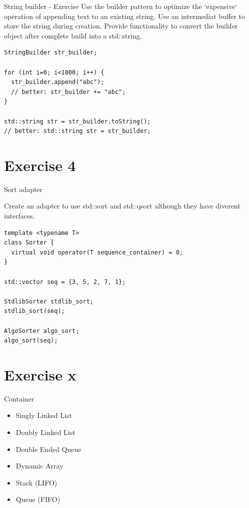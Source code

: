 \documentclass{beamer}
\begin{document}
\begin{frame}[fragile]{String builder - Exercise}
Use the builder pattern to optimize the `expensive` operation of appending text
to an existing string. Use an intermediat buffer to store the string during
creation. Provide functionality to convert the builder object after complete
build into a std::string.

\begin{lstlisting}
StringBuilder str_builder;

for (int i=0; i<1000; i++) {
  str_builder.append("abc");
  // better: str_builder += "abc";
}

std::string str = str_builder.toString();
// better: std::string str = str_builder;
\end{lstlisting}

\end{frame}

\section{Exercise 4}
\begin{frame}[fragile]{Sort adapter}

Create an adapter to use std::sort and std::qsort although they have diverent
interfaces.

\begin{lstlisting}
template <typename T>
class Sorter {
  virtual void operator(T sequence_container) = 0;
}

std::vector seq = {3, 5, 2, 7, 1};

StdlibSorter stdlib_sort;
stdlib_sort(seq);

AlgoSorter algo_sort;
algo_sort(seq);
\end{lstlisting}

\end{frame}

\section{Exercise x}

\begin{frame}{Container}
\begin{itemize}
  \item Singly Linked List
  \item Doubly Linked List
  \item Double Ended Queue
  \item Dynamic Array
  \item Stack (LIFO)
  \item Queue (FIFO)
\end{itemize}
\end{frame}
\end{document}
